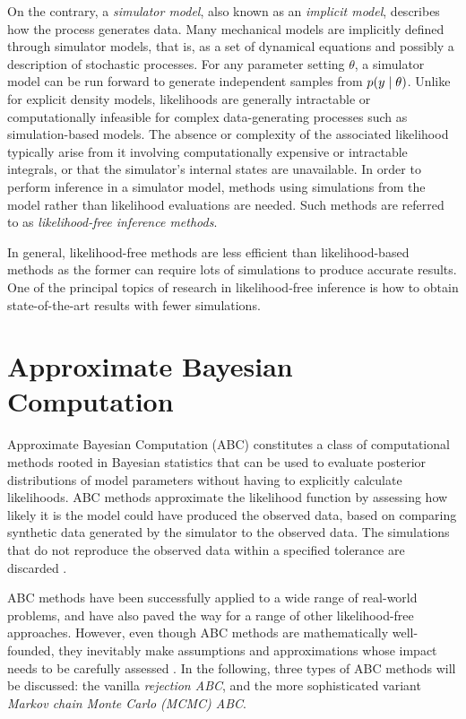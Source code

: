 On the contrary, a \textit{simulator model}, also known as an \textit{implicit model}, describes how the process generates data. Many mechanical models are implicitly defined through simulator models, that is, as a set of dynamical equations and possibly a description of stochastic processes. For any parameter setting $\theta$, a simulator model can be run forward to generate independent samples from $p \qty(y \mid \theta)$. Unlike for explicit density models, likelihoods are generally intractable or computationally infeasible for complex data-generating processes such as simulation-based models. The absence or complexity of the associated likelihood typically arise from it involving computationally expensive or intractable integrals, or that the simulator's internal states are unavailable. In order to perform inference in a simulator model, methods using simulations from the model rather than likelihood evaluations are needed. Such methods are referred to as \textit{likelihood-free inference methods}.

In general, likelihood-free methods are less efficient than likelihood-based methods as the former can require lots of simulations to produce accurate results. One of the principal topics of research in likelihood-free inference is how to obtain state-of-the-art results with fewer simulations. 

\section{Approximate Bayesian Computation}\label{sec:abc}

Approximate Bayesian Computation (ABC) constitutes a class of computational methods rooted in Bayesian statistics that can be used to evaluate posterior distributions of model parameters without having to explicitly calculate likelihoods. ABC methods approximate the likelihood function by assessing how likely it is the model could have produced the observed data, based on comparing synthetic data generated by the simulator to the observed data. The simulations that do not reproduce the observed data within a specified tolerance are discarded \cite{ABCprimer}.

ABC methods have been successfully applied to a wide range of real-world problems, and have also paved the way for a range of other likelihood-free approaches. However, even though ABC methods are mathematically well-founded, they inevitably make assumptions and approximations whose impact needs to be carefully assessed \cite{ABCprimer}. In the following, three types of ABC methods will be discussed: the vanilla \textit{rejection ABC}, and the more sophisticated variant \textit{Markov chain Monte Carlo (MCMC) ABC}.


